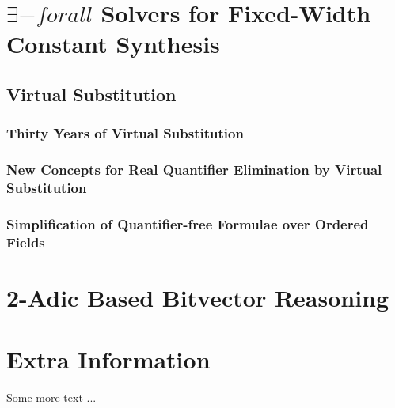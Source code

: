 \documentclass[withindex,glossary]{cam-thesis}
\begin{document}
\chapter{$\exists-forall$ Solvers for Fixed-Width Constant Synthesis}

\section{Virtual Substitution}
\subsection{Thirty Years of Virtual Substitution}
\subsection{New Concepts for Real Quantifier Elimination by Virtual Substitution}
\subsection{Simplification of Quantifier-free Formulae over Ordered Fields}

\chapter{2-Adic Based Bitvector Reasoning}





%

\renewcommand{\bibname}{References}
\cleardoublepage
{}
{}






\appendix

\chapter{Extra Information}
Some more text ...



\printthesisindex
\end{document}
